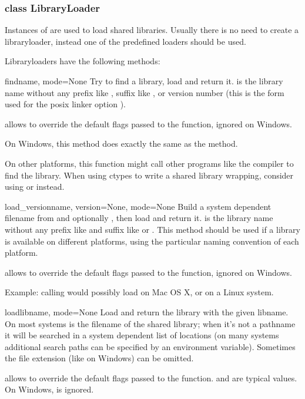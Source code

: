 \subsubsection{class LibraryLoader\label{ctypes-class-libraryloader}}

Instances of  are used to load shared libraries.
Usually there is no need to create a libraryloader, instead one of the
predefined loaders should be used.

Libraryloaders have the following methods:

\begin{funcdesc}{find}{name, mode=None}
Try to find a library, load and return it.   is the
library name without any prefix like , suffix like ,
 or version number (this is the form used for the posix
linker option ).

 allows to override the default flags passed to the
 function, ignored on Windows.

On Windows, this method does exactly the same as the 
method.

On other platforms, this function might call other programs like
the compiler to find the library.  When using ctypes to write a
shared library wrapping, consider using  or
 instead.
\end{funcdesc}

\begin{funcdesc}{load_version}{name, version=None, mode=None}
Build a system dependent filename from  and optionally
, then load and return it.   is the library
name without any prefix like  and suffix like  or
.  This method should be used if a library is available
on different platforms, using the particular naming convention of
each platform.

 allows to override the default flags passed to the
 function, ignored on Windows.

Example: calling  would
possibly load  on Mac OS X, or
 on a Linux system.
\end{funcdesc}

\begin{funcdesc}{load}{libname, mode=None}
Load and return the library with the given libname.  On most
systems  is the filename of the shared library; when
it's not a pathname it will be searched in a system dependent list
of locations (on many systems additional search paths can be
specified by an environment variable).  Sometimes the file
extension (like  on Windows) can be omitted.

 allows to override the default flags passed to the
 function.   and  are
typical values.  On Windows,  is ignored.
\end{funcdesc}


